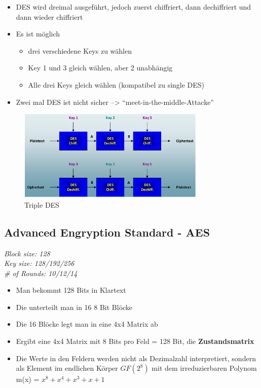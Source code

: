 \begin{itemize}
\tightlist
\item
  DES wird dreimal ausgeführt, jedoch zuerst chiffriert, dann
  dechiffriert und dann wieder chiffriert
\item
  Es ist möglich

  \begin{itemize}
  \tightlist
  \item
    drei verschiedene Keys zu wählen
  \item
    Key 1 und 3 gleich wählen, aber 2 unabhängig
  \item
    Alle drei Keys gleich wählen (kompatibel zu single DES)
  \end{itemize}
\item
  Zwei mal DES ist nicht sicher --\textgreater{}
  ``meet-in-the-middle-Attacke''
\end{itemize}

\begin{figure}[H]
\centering
\includegraphics[width=0.8\textwidth]{figures/tripleDES.png}
\caption{Triple DES}
\end{figure}

\hypertarget{advanced-engryption-standard---aes}{%
\subsection{Advanced Engryption Standard -
AES}\label{advanced-engryption-standard---aes}}

\emph{Block size: 128}\\
\emph{Key size: 128/192/256}\\
\emph{\# of Rounds: 10/12/14}

\begin{itemize}
\tightlist
\item
  Man bekommt 128 Bits in Klartext
\item
  Die unterteilt man in 16 8 Bit Blöcke
\item
  Die 16 Blöcke legt man in eine 4x4 Matrix ab
\item
  Ergibt eine 4x4 Matrix mit 8 Bits pro Feld = 128 Bit, die
  \textbf{Zustandsmatrix}
\item
  Die Werte in den Feldern werden nicht als Dezimalzahl interpretiert,
  sondern als Element im endlichen Körper $GF(2^8)$ mit dem irreduzierbaren
  Polynom m(x) = $x^8+ x^4 + x^3 + x + 1$
\end{itemize}

